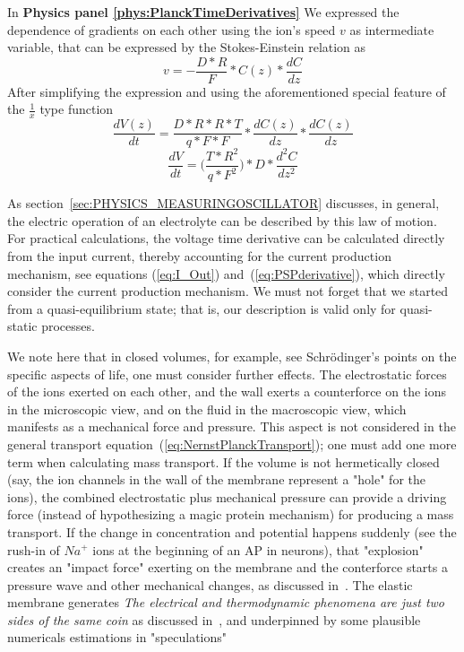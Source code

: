 {In \textbf{Physics panel \ref{phys:PlanckTimeDerivatives}}
We expressed the dependence of gradients on each other using the ion's speed $v$ as intermediate variable, that can be expressed by the Stokes-Einstein relation as
\begin{equation}
	v= -\frac{D*R}{F}*C(z)*\frac{dC}{dz}
	\label{eq:StokesEinsteinSpeed2}
\end{equation}
After simplifying the expression and using the aforementioned special feature of the $\frac{1}{x}$ type function
\begin{equation}
	\frac{dV(z)}{dt}=\frac{D*R*R*T}{q*F*F}*\frac{dC(z)}{dz}*\frac{dC(z)}{dz}\label{eq:Nernst-dVdtDR}
\end{equation}
%
\begin{equation}
	\frac{dV}{dt}=\biggl(\frac{T*R^2}{q*F^2}\biggr)*D*\frac{d^2C}{dz^2}
	\label{eq:FickSecondElectrodiffusion}
\end{equation}
}

%
As section~\ref{sec:PHYSICS_MEASURINGOSCILLATOR} discusses, in general, the electric operation
of an electrolyte can be described by this law of motion.
 For practical calculations, the voltage time derivative can be calculated directly from the input current, thereby accounting for the current production mechanism, see equations (\ref{eq:I_Out}) and~(\ref{eq:PSPderivative}), which directly consider the current production mechanism.
We must not forget that we started 
from a quasi-equilibrium state; that is, our description is valid only for quasi-static processes.

We note here that in closed volumes, for example, see Schrödinger's points on the specific aspects of life, one must consider further effects.
The electrostatic forces of the ions exerted on
each other, and the wall exerts a counterforce 
on the ions in the microscopic view, and on the fluid in the macroscopic view, which manifests as a mechanical force and pressure.
This aspect is not considered in the general transport equation~(\ref{eq:NernstPlanckTransport}); one must add one more term
when calculating mass transport.
If the volume is not hermetically closed (say, the ion channels in the 
wall of the membrane represent a "hole" for the ions), the combined 
electrostatic plus mechanical pressure can provide a driving force (instead of hypothesizing a magic protein mechanism)
for producing a mass transport. If the change in concentration and potential happens suddenly (see the rush-in of $Na^+$ ions at the
beginning of an \gls{AP} in neurons), that "explosion" creates an "impact force" exerting on the membrane
and the conterforce starts a pressure wave and other mechanical changes, as discussed in~\cite{MechanicalPropertiesNerves:2025}. The elastic membrane 
generates 
\textit{The electrical and thermodynamic phenomena are just two sides of the same coin} as discussed in~\cite{VeghUnifiedCrossdisciplinaryModel:2026},
and underpinned by
some plausible numericals estimations in "speculations"

